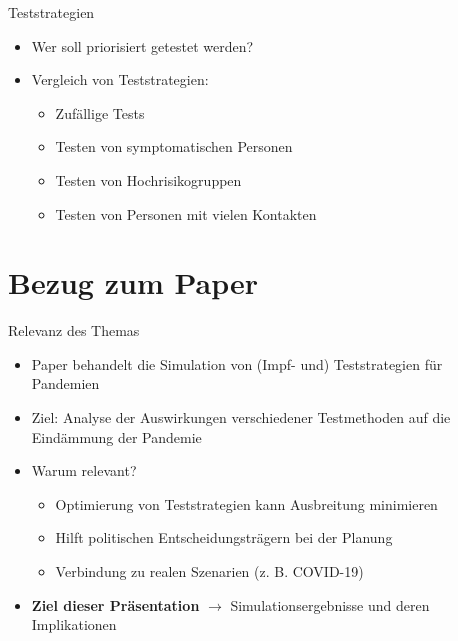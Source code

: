 \documentclass[ngerman,14pt,aspectratio=1610]{beamer}
\def\secname{Gliederung} %
\let\oldsection\section
\renewcommand{\section}[1]{
	\oldsection{#1}
	\newtotcounter{#1}
	\def\secname{#1}
}
\newcommand{\source}{}
\begin{document}
	\begin{frame}[t]{Teststrategien} \vspace{40pt}
		\begin{itemize}
			\item Wer soll priorisiert getestet werden?
			\item Vergleich von Teststrategien:
			\begin{itemize}
				\item Zufällige Tests
				\item Testen von symptomatischen Personen
				\item Testen von Hochrisikogruppen
				\item Testen von Personen mit vielen Kontakten
			\end{itemize}
		\end{itemize}
	\end{frame}
	
	\section{Bezug zum Paper}
	
	\renewcommand{\source}{ }
	
	\begin{frame}[t]{Relevanz des Themas} \vspace{5pt}
		\begin{itemize}
			\item Paper behandelt die Simulation von (Impf- und) Teststrategien für Pandemien
			\item Ziel: Analyse der Auswirkungen verschiedener Testmethoden auf die Eindämmung der Pandemie
			\item Warum relevant?
			\begin{itemize}
				\item Optimierung von Teststrategien kann Ausbreitung minimieren
				\item Hilft politischen Entscheidungsträgern bei der Planung
				\item Verbindung zu realen Szenarien (z. B. COVID-19)
			\end{itemize}
			\item \textbf{\alert{Ziel dieser Präsentation}} $\rightarrow$ Simulationsergebnisse und deren Implikationen
		\end{itemize}
	\end{frame}
	
	\renewcommand{\source}{Quelle: \url{https://arxiv.org/pdf/2210.13089}}
	
\end{document}
